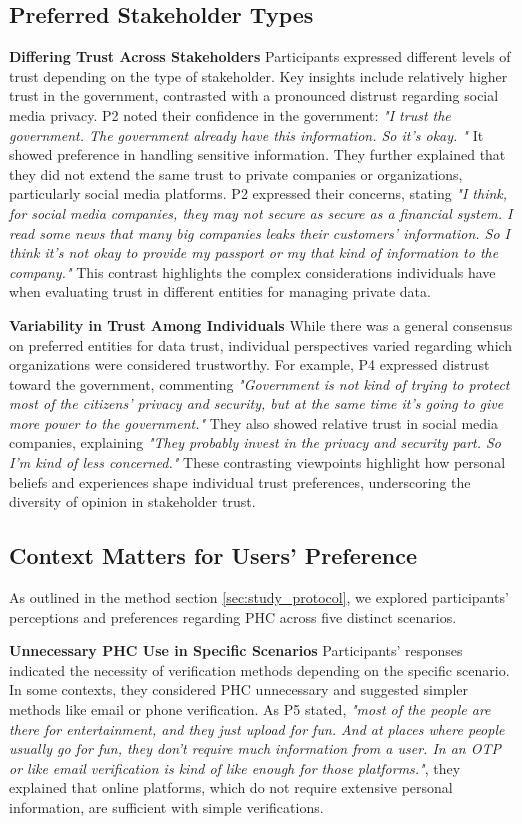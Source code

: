 \subsection{Preferred Stakeholder Types}
\textbf{Differing Trust Across Stakeholders}
Participants expressed different levels of trust depending on the type of stakeholder. Key insights include relatively higher trust in the government, contrasted with a pronounced distrust regarding social media privacy. P2 noted their confidence in the government: \textit{"I trust the government. The government already have this information. So it's okay. "} It showed preference in handling sensitive information. They further explained that they did not extend the same trust to private companies or organizations, particularly social media platforms. P2 expressed their concerns, stating \textit{"I think, for social media companies, they may not secure as secure as a financial system. I read some news that many big companies leaks their customers' information. So I think it's not okay to provide my passport or my that kind of information to the company."} This contrast highlights the complex considerations individuals have when evaluating trust in different entities for managing private data.

\textbf{Variability in Trust Among Individuals}
While there was a general consensus on preferred entities for data trust, individual perspectives varied regarding which organizations were considered trustworthy. For example, P4 expressed distrust toward the government, commenting \textit{"Government is not kind of trying to protect most of the citizens’ privacy and security, but at the same time it’s going to give more power to the government."} They also showed relative trust in social media companies, explaining \textit{"They probably invest in the privacy and security part. So I’m kind of less concerned."} These contrasting viewpoints highlight how personal beliefs and experiences shape individual trust preferences, underscoring the diversity of opinion in stakeholder trust.


\subsection{Context Matters for Users' Preference}
As outlined in the method section \ref{sec:study_protocol}, we explored participants’ perceptions and preferences regarding PHC across five distinct scenarios. 

\textbf{Unnecessary PHC Use in Specific Scenarios} Participants’ responses indicated the necessity of verification methods depending on the specific scenario.  In some contexts, they considered PHC unnecessary and suggested simpler methods like email or phone verification. As P5 stated, \textit{"most of the people are there for entertainment, and they just upload for fun. And at places where people usually go for fun, they don't require much information from a user. In an OTP or like email verification is kind of like enough for those platforms."}, they explained that online platforms, which do not require extensive personal information, are sufficient with simple verifications.

